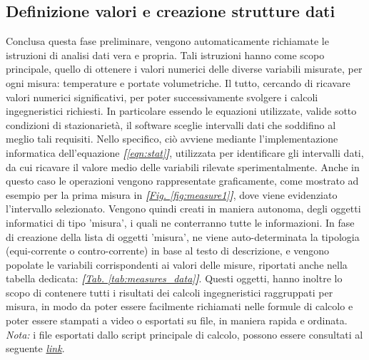 \documentclass[a4paper,10pt]{article}                                                                                       %
\begin{document}
\subsection{Definizione valori e creazione strutture dati}                                                                  %
\label{subsec:valsdef_datastruct}                                                                                           %
  Conclusa questa fase preliminare, vengono automaticamente richiamate le istruzioni di analisi dati vera e propria. Tali
  istruzioni hanno come scopo principale, quello di ottenere i valori numerici delle diverse variabili misurate, per ogni
  misura: temperature e portate volumetriche. Il tutto, cercando di ricavare valori numerici significativi, per poter
  successivamente svolgere i calcoli ingegneristici richiesti. In particolare essendo le equazioni utilizzate, valide
  sotto condizioni di stazionarietà, il software sceglie intervalli dati che soddifino al meglio tali requisiti. Nello
  specifico, ciò avviene mediante l'implementazione informatica dell'equazione
  \textit{\textbf{[}\ref{eqn:stat}\textbf{]}}, utilizzata per identificare gli intervalli dati, da cui ricavare il valore
  medio delle variabili rilevate sperimentalmente. Anche in questo caso le operazioni vengono rappresentate graficamente,
  come mostrato ad esempio per la prima misura in
  \textit{\textbf{[}\hyperref[fig:measure1]{Fig. }\ref{fig:measure1}\textbf{]}}, dove viene evidenziato l'intervallo
  selezionato. Vengono quindi creati in maniera autonoma, degli oggetti informatici di tipo 'misura', i quali ne
  conterranno tutte le informazioni. In fase di creazione della lista di oggetti 'misura', ne viene auto-determinata la
  tipologia (equi-corrente o contro-corrente) in base al testo di descrizione, e vengono popolate le variabili
  corrispondenti ai valori delle misure, riportati anche nella tabella dedicata:
  \textit{\textbf{[}\hyperref[tab:measures_data]{Tab. }\ref{tab:measures_data}\textbf{]}}. Questi oggetti, hanno inoltre
  lo scopo di contenere tutti i risultati dei calcoli ingegneristici raggruppati per misura, in modo da poter essere
  facilmente richiamati nelle formule di calcolo e poter essere stampati a video o esportati su file, in maniera rapida
  e ordinata.\vspace{2mm}\\
  \textit{Nota:} i file esportati dallo script principale di calcolo, possono essere consultati al seguente
  \textit{\href{https://github.com/CristianMerli/DataAnalysis/tree/master/final_doc/code_exports/output}{link}}.
\end{document}
